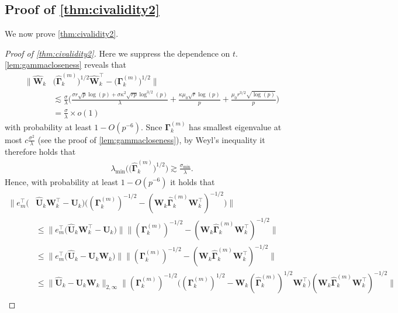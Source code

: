 \documentclass[10pt]{article}
\newcommand{\0}{{\mathbf{0}}}
\newcommand{\1}{{\mathbf{1}}}
\newcommand{\U}{{\mathbf{U}}}
\renewcommand{\t}{^{\top}}
\newcommand{\uhat}{\mathbf{\hat{U}}}
\renewcommand{\hat}{\widehat}
\renewcommand{\hat}{\widehat}
\begin{document}
\subsection{Proof of \cref{thm:civalidity2}} \label{sec:civalidity2proofs}
We now prove \cref{thm:civalidity2}.

\begin{proof}[Proof of \cref{thm:civalidity2}]
Here we suppress the dependence on $t$. \cref{lem:gammacloseness} reveals that
\begin{align*}
   \| \mathbf{\hat W}_k&\big(\mathbf{\hat \Gamma}^{(m)}_k \big)^{1/2}\mathbf{\hat W}_k\t -\big(\mathbf{\Gamma}^{(m)}_k \big)^{1/2} \|  \\
   &\lesssim \frac{\sigma}{\lambda} \bigg( \frac{\sigma r \sqrt{p}\log(p) + \sigma \kappa^2 \sqrt{rp} \log^{3/2}(p)}{\lambda} + \frac{\kappa \mu_0 \sqrt{r} \log(p)}{p} + \frac{\mu_0 r^{3/2} \sqrt{\log(p)}}{p} \bigg) \\
   &= \frac{\sigma}{\lambda} \times o(1)
\end{align*}
with probability at least $1 - O(p^{-6})$.  Snce $\mathbf{\Gamma}_k^{(m)}$ has smallest eigenvalue at most $c\frac{\sigma^2}{\lambda}$ (see the proof of \cref{lem:gammacloseness}), by Weyl's inequality it therefore holds that
\begin{align}
    \lambda_{\min} \bigg( \big(\mathbf{\hat \Gamma}^{(m)}_k \big)^{1/2}\bigg) \gtrsim \frac{\sigma_{\min}}{\lambda}. \label{lowerbdongamma}
\end{align}
Hence, with probability at least $1 - O(p^{-6})$ it holds that
\begin{align*}
    \| e_m\t \bigg( &\uhat_k \mathbf{W}_k\t- \U_k   \bigg) \big( (\mathbf{\Gamma}^{(m)}_k)^{-1/2} - (\mathbf{W}_k \mathbf{\hat \Gamma}^{(m)}_k \mathbf{W}_k\t )^{-1/2} \big) \| \\
    &\leq \| e_m\t \big(  \uhat_k \mathbf{W}_k\t- \U_k   \big) \| \| (\mathbf{\Gamma}^{(m)}_k)^{-1/2} - (\mathbf{W}_k \mathbf{\hat \Gamma}^{(m)}_k \mathbf{W}_k\t )^{-1/2} \| \\
    &\leq \| e_m\t \big( \uhat_k- \U_k  \mathbf{W}_k \big) \| \| (\mathbf{\Gamma}^{(m)}_k)^{-1/2} - (\mathbf{W}_k \mathbf{\hat \Gamma}^{(m)}_k \mathbf{W}_k\t )^{-1/2} \| \\
    &\leq \| \uhat_k - \U_k \mathbf{W}_k \|_{2,\infty} \| (\mathbf{\Gamma}^{(m)}_k)^{-1/2} \bigg( (\mathbf{\Gamma}^{(m)}_k)^{1/2} - \mathbf{W}_k(\mathbf{\hat \Gamma}^{(m)}_k)^{1/2}\mathbf{W}_k\t  \bigg) ( \mathbf{W}_k \mathbf{\hat \Gamma}^{(m)}_k\mathbf{W}_k\t )^{-1/2} \| \\

\end{align*}
\end{proof}
\end{document}

